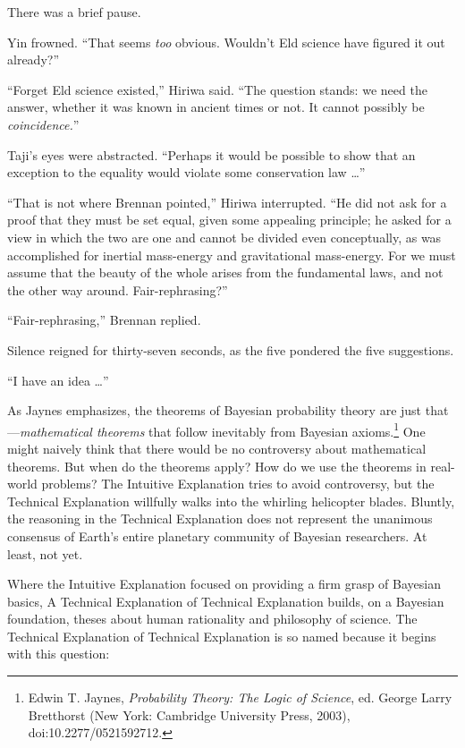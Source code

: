 {
 There was a brief pause.}

{
 Yin frowned. ``That seems \textit{too} obvious.
Wouldn't Eld science have figured it out
already?''}

{
 ``Forget Eld science existed,''
Hiriwa said. ``The question stands: we need the
answer, whether it was known in ancient times or not. It cannot
possibly be \textit{coincidence.}''}

{
 Taji's eyes were abstracted.
``Perhaps it would be possible to show that an
exception to the equality would violate some conservation law
\ldots''}

{
 ``That is not where Brennan
pointed,'' Hiriwa interrupted. ``He
did not ask for a proof that they must be set equal, given some
appealing principle; he asked for a view in which the two are one and
cannot be divided even conceptually, as was accomplished for inertial
mass-energy and gravitational mass-energy. For we must assume that the
beauty of the whole arises from the fundamental laws, and not the other
way around. Fair-rephrasing?''}

{
 ``Fair-rephrasing,'' Brennan
replied.}

{
 Silence reigned for thirty-seven seconds, as the five pondered the
five suggestions.}

{
 ``I have an idea \ldots''}

\myendsectiontext


{
 As Jaynes emphasizes, the theorems of Bayesian probability theory
are just that---\textit{mathematical theorems} that follow inevitably
from Bayesian axioms.\footnote{Edwin T. Jaynes, \textit{Probability Theory: The Logic of
Science}, ed. George Larry Bretthorst (New York: Cambridge University
Press, 2003), doi:10.2277/0521592712.} One might naively think that
there would be no controversy about mathematical theorems. But when do
the theorems apply? How do we use the theorems in real-world problems?
The Intuitive Explanation tries to avoid controversy, but the Technical
Explanation willfully walks into the whirling helicopter blades.
Bluntly, the reasoning in the Technical Explanation does not represent
the unanimous consensus of Earth's entire planetary
community of Bayesian researchers. At least, not yet.}

{
 Where the Intuitive Explanation focused on providing a firm grasp
of Bayesian basics, A Technical Explanation of Technical Explanation
builds, on a Bayesian foundation, theses about human rationality and
philosophy of science. The Technical Explanation of Technical
Explanation is so named because it begins with this question:}

